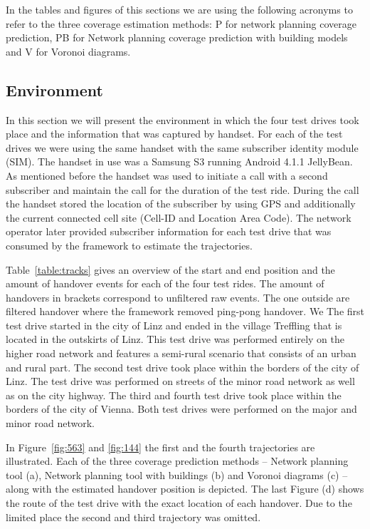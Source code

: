 \documentclass[twocolumn]{bmcart}%
\begin{document}
In the tables and figures of this sections we are using the following acronyms to refer to the three coverage estimation methods: P for network planning coverage prediction, PB for Network planning coverage prediction with building models and V for Voronoi diagrams.
\subsection*{Environment}
In this section we will present the environment in which the four test drives took place and the information that was captured by handset. For each of the test drives we were using the same handset with the same subscriber identity module (SIM). The handset in use was a Samsung S3 running Android 4.1.1 JellyBean. As mentioned before the handset was used to initiate a call with a second subscriber and maintain the call for the duration of the test ride. During the call the handset stored the location of the subscriber by using GPS and additionally the current connected cell site (Cell-ID and Location Area Code). The network operator later provided subscriber information for each test drive that was consumed by the framework to estimate the trajectories.

Table~\ref{table:tracks} gives an overview of the start and end position and the amount of handover events for each of the four test rides. The amount of handovers in brackets correspond to unfiltered raw events. The one outside are filtered handover where the framework removed ping-pong handover. We  The first test drive started in the city of Linz and ended in the village Treffling that is located in the outskirts of Linz. This test drive was performed entirely on the higher road network and features a semi-rural scenario that consists of an urban and rural part. The second test drive took place within the borders of the city of Linz. The test drive was performed on streets of the minor road network as well as on the city highway. The third and fourth test drive took place within the borders of the city of Vienna. Both test drives were performed on the major and minor road network.

In Figure~\ref{fig:563} and \ref{fig:144} the first and the fourth trajectories are illustrated. Each of the three coverage prediction methods -- Network planning tool (a), Network planning tool with buildings (b) and Voronoi diagrams (c) -- along with the estimated handover position is depicted. The last Figure (d) shows the route of the test drive with the exact location of each handover. Due to the limited place the second and third trajectory was omitted.
\end{document}
